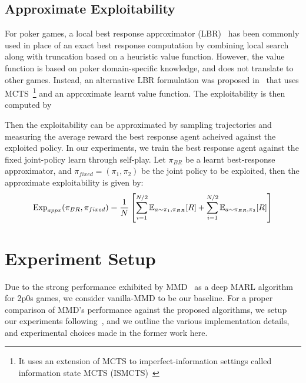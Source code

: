 \subsection{Approximate Exploitability}
For poker games, a local best response approximator (LBR)~\cite{lisyEquilibrium2017} has been
commonly used in place of an exact best response computation by combining local search along with
truncation based on a heuristic value function.
However, the value function is based on poker domain-specific knowledge, and does not translate to
other games.
Instead, an alternative LBR formulation was proposed in~\cite{timbersApproximate2022} that uses
MCTS~\footnote{It uses an extension of MCTS to imperfect-information settings called information
	state MCTS (ISMCTS)~\cite{cowlingInformation2012}} and an approximate learnt value function.
The exploitability is then computed by

Then the exploitability can be
approximated by sampling trajectories and measuring the average reward the best response agent
acheived against the exploited policy.
In our experiments, we train the best response agent against the fixed joint-policy learn through
self-play.
Let $\pi_{BR}$ be a learnt best-response approximator, and $\pi_{fixed}=(\pi_1, \pi_2)$ be the
joint policy to be exploited, then the approximate exploitability is given by:
\begin{equation}
	\label{eqn:appxexp} \text{Exp}_{appx} (\pi_{BR}, \pi_{fixed}) = \frac{1}{N} \left[ \sum_{i=1}^{N/2}
		\mathbb{E}_{a \sim \pi_1, \pi_{BR}} [R] + \sum_{i=1}^{N/2} \mathbb{E}_{a \sim \pi_{BR}, \pi_2} [R] \right]
\end{equation} 

\section{Experiment Setup}
Due to the strong performance exhibited by MMD~\cite{sokotaUnified2023} as a deep MARL algorithm
for 2p0s games, we consider vanilla-MMD to be our baseline.
For a proper comparison of MMD's performance against the proposed algorithms, we setup our
experiments following~\cite{sokotaUnified2023}, and we outline the various implementation details,
and experimental choices made in the former work here.

